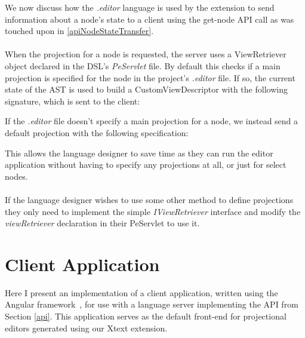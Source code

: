 \documentclass{article}
\begin{document}
{We now discuss how the \emph{.editor} language is used by the extension to send information about a node's state to a client using the get-node API call as was touched upon in \ref{apiNodeStateTransfer}. 
\\
\\
When the projection for a node is requested, the server uses a ViewRetriever object declared in the DSL's \emph{PeServlet} file. By default this checks if a main projection is specified for the node in the project's \emph{.editor} file. If so, the current state of the AST is used to build a CustomViewDescriptor with the following signature, which is sent to the client: 

\vspace*{0.1cm}
If the \emph{.editor} file doesn't specify a main projection for a node, we instead send a default projection with the following specification: 

This allows the language designer to save time as they can run the editor application without having to specify any projections at all, or just for select nodes. 
\\
\\
If the language designer wishes to use some other method to define projections they only need to implement the simple \emph{IViewRetriever} interface and modify the \emph{viewRetriever} declaration in their PeServlet to use it.


\section{Client Application}\label{clientApp}
Here I present an implementation of a client application, written using the Angular framework~\cite{angular}, for use with a language server implementing the API from Section \ref{api}. This application serves as the default front-end for projectional editors generated using our Xtext extension. 

}
\end{document}

